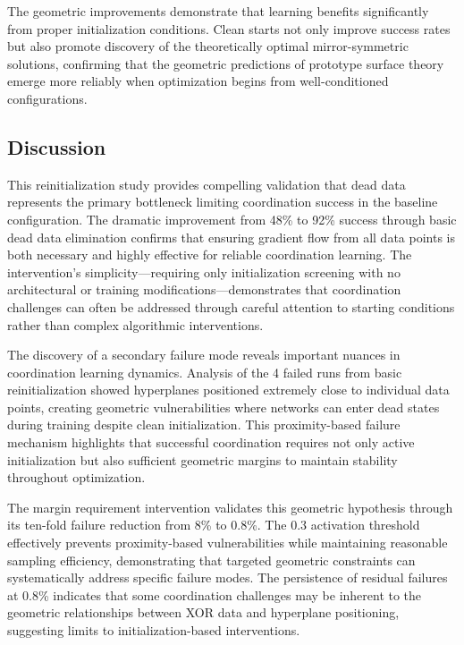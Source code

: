 The geometric improvements demonstrate that learning benefits significantly from proper initialization conditions. Clean starts not only improve success rates but also promote discovery of the theoretically optimal mirror-symmetric solutions, confirming that the geometric predictions of prototype surface theory emerge more reliably when optimization begins from well-conditioned configurations.


\subsection*{Discussion}

This reinitialization study provides compelling validation that dead data represents the primary bottleneck limiting coordination success in the baseline configuration. The dramatic improvement from 48\% to 92\% success through basic dead data elimination confirms that ensuring gradient flow from all data points is both necessary and highly effective for reliable coordination learning. The intervention's simplicity—requiring only initialization screening with no architectural or training modifications—demonstrates that coordination challenges can often be addressed through careful attention to starting conditions rather than complex algorithmic interventions.

The discovery of a secondary failure mode reveals important nuances in coordination learning dynamics. Analysis of the 4 failed runs from basic reinitialization showed hyperplanes positioned extremely close to individual data points, creating geometric vulnerabilities where networks can enter dead states during training despite clean initialization. This proximity-based failure mechanism highlights that successful coordination requires not only active initialization but also sufficient geometric margins to maintain stability throughout optimization.

The margin requirement intervention validates this geometric hypothesis through its ten-fold failure reduction from 8\% to 0.8\%. The 0.3 activation threshold effectively prevents proximity-based vulnerabilities while maintaining reasonable sampling efficiency, demonstrating that targeted geometric constraints can systematically address specific failure modes. The persistence of residual failures at 0.8\% indicates that some coordination challenges may be inherent to the geometric relationships between XOR data and hyperplane positioning, suggesting limits to initialization-based interventions.

